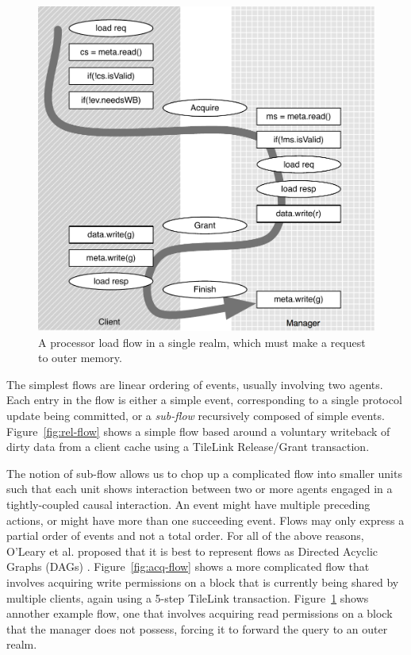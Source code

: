 \begin{figure}
\centering
\includegraphics[width=0.8\columnwidth]{coherence/figures/outer-acq-flow.pdf}
\caption[A processor load flow that misses twice.]{
A processor load flow in a single realm, which must make a request to outer memory.
}
\label{fig:outer-acq-flow}
\end{figure}

The simplest flows are linear ordering of events, usually involving two agents.
Each entry in the flow is either a simple event,
corresponding to a single protocol update being committed,
or a \emph{sub-flow} recursively composed of simple events.
Figure~\ref{fig:rel-flow} shows a simple flow based around a voluntary writeback of dirty data from a client cache
using a TileLink Release/Grant transaction.

The notion of sub-flow allows us to
chop up a complicated flow into smaller units such that each
unit shows interaction between two or more agents engaged in a tightly-coupled causal interaction.
An event might have multiple preceding actions,
or might have more than one succeeding event.
Flows may only express a partial order of events and not a total order.
For all of the above reasons, O'Leary et al. proposed that it is best to represent flows as Directed Acyclic Graphs (DAGs)
\cite{oleary-fmcad09}.
Figure~\ref{fig:acq-flow} shows a more complicated flow that involves acquiring write permissions on a block that is currently being
shared by multiple clients, again using a 5-step TileLink transaction.
Figure~\ref{fig:outer-acq-flow} shows annother example flow, one that involves acquiring read permissions on a block that the manager does not possess, forcing it to forward the query to an outer realm.


